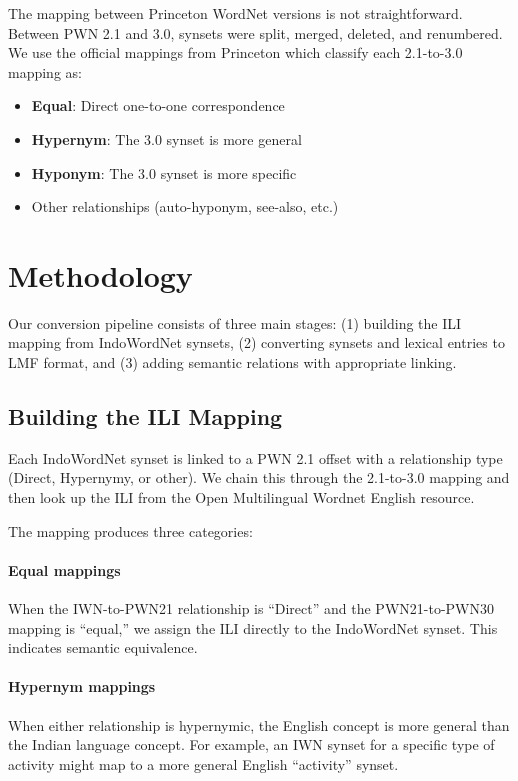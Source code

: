 \documentclass[11pt]{article}
\begin{document}
The mapping between Princeton WordNet versions is not straightforward.
Between PWN 2.1 and 3.0, synsets were split, merged, deleted, and renumbered.
We use the official mappings from Princeton \cite{daudert2018pwn21-30} which classify each 2.1-to-3.0 mapping as:
\begin{itemize}
\item \textbf{Equal}: Direct one-to-one correspondence
\item \textbf{Hypernym}: The 3.0 synset is more general
\item \textbf{Hyponym}: The 3.0 synset is more specific
\item Other relationships (auto-hyponym, see-also, etc.)
\end{itemize}

\section{Methodology}

Our conversion pipeline consists of three main stages:
(1) building the ILI mapping from IndoWordNet synsets,
(2) converting synsets and lexical entries to LMF format, and
(3) adding semantic relations with appropriate linking.

\subsection{Building the ILI Mapping}

Each IndoWordNet synset is linked to a PWN 2.1 offset with a relationship type (Direct, Hypernymy, or other).
We chain this through the 2.1-to-3.0 mapping and then look up the ILI from the Open Multilingual Wordnet English resource.

The mapping produces three categories:

\paragraph{Equal mappings}
When the IWN-to-PWN21 relationship is ``Direct'' and the PWN21-to-PWN30 mapping is ``equal,'' we assign the ILI directly to the IndoWordNet synset.
This indicates semantic equivalence.

\paragraph{Hypernym mappings}
When either relationship is hypernymic, the English concept is more general than the Indian language concept.
For example, an IWN synset for a specific type of activity might map to a more general English ``activity'' synset.
\end{document}
